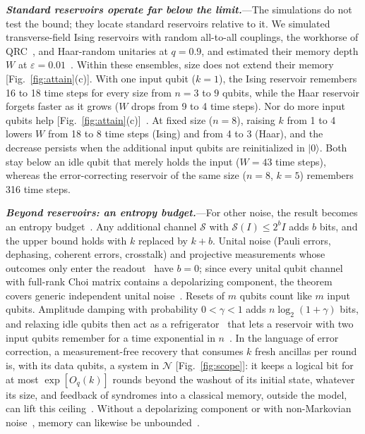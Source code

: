 \documentclass[aps,prl,twocolumn,superscriptaddress,floatfix]{revtex4-2}
\theoremstyle{plain}
\newcommand{\ket}[1]{|#1\rangle}
\newcommand{\runin}[1]{\textit{\textbf{#1}}---}
\begin{document}
\runin{Standard reservoirs operate far below the limit.}The simulations do not test the bound; they locate standard reservoirs relative to it. We simulated transverse-field Ising reservoirs with random all-to-all couplings, the workhorse of QRC~\cite{Fujii2017,Nakajima2019,MartinezPena2021}, and Haar-random unitaries at $q=0.9$, and estimated their memory depth $W$ at $\varepsilon=0.01$~\cite{SM}. Within these ensembles, size does not extend their memory [Fig.~\ref{fig:attain}(c)]. With one input qubit ($k=1$), the Ising reservoir remembers 16 to 18 time steps for every size from $n=3$ to $9$ qubits, while the Haar reservoir forgets faster as it grows ($W$ drops from 9 to 4 time steps). Nor do more input qubits help [Fig.~\ref{fig:attain}(c)]~\cite{SM}. At fixed size ($n=8$), raising $k$ from 1 to 4 lowers $W$ from 18 to 8 time steps (Ising) and from 4 to 3 (Haar), and the decrease persists when the additional input qubits are reinitialized in $\ket0$. Both stay below an idle qubit that merely holds the input ($W=43$ time steps), whereas the error-correcting reservoir of the same size ($n=8$, $k=5$) remembers 316 time steps.

\runin{Beyond reservoirs: an entropy budget.}For other noise, the result becomes an entropy budget~\cite{SM}. Any additional channel $\mathcal S$ with $\mathcal S(I)\le2^bI$ adds $b$ bits, and the upper bound holds with $k$ replaced by $k+b$. Unital noise (Pauli errors, dephasing, coherent errors, crosstalk) and projective measurements whose outcomes only enter the readout~\cite{Mujal2023} have $b=0$; since every unital qubit channel with full-rank Choi matrix contains a depolarizing component, the theorem covers generic independent unital noise~\cite{SM}. Resets of $m$ qubits count like $m$ input qubits. Amplitude damping with probability $0<\gamma<1$ adds $n\log_2(1+\gamma)$ bits, and relaxing idle qubits then act as a refrigerator~\cite{BenOr2013} that lets a reservoir with two input qubits remember for a time exponential in $n$~\cite{SM,Hoeffding1963}. In the language of error correction, a measurement-free recovery that consumes $k$ fresh ancillas per round is, with its data qubits, a system in $\mathcal N$ [Fig.~\ref{fig:scope}]: it keeps a logical bit for at most $\exp[O_q(k)]$ rounds beyond the washout of its initial state, whatever its size, and feedback of syndromes into a classical memory, outside the model, can lift this ceiling~\cite{SM}. Without a depolarizing component or with non-Markovian noise~\cite{Sannia2026}, memory can likewise be unbounded~\cite{SM}.
\end{document}
